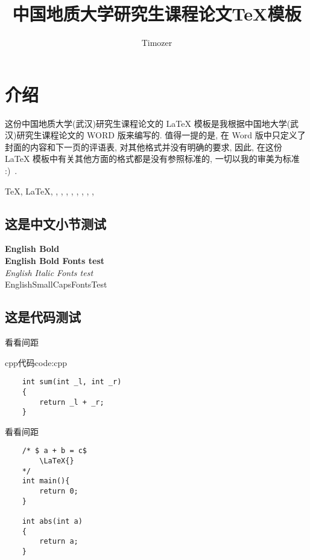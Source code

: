 \documentclass{cugrep}
\title{中国地质大学研究生课程论文\TeX{}模板}
\author{Timozer}
\begin{document}
\maketitle

\frontmatter
{}
\makeabstract 

\tableofcontents
\clearpage

\mainmatter
\chapter{介绍}
这份中国地质大学(武汉)研究生课程论文的 \LaTeX{} 模板是我根据中国地大学(武汉)研究生课程论文的 {\sc WORD} 版来编写的. 
值得一提的是, 在 {\sc Word} 版中只定义了封面的内容和下一页的评语表, 对其他格式并没有明确的要求, 因此, 
在这份 \LaTeX{} 模板中有关其他方面的格式都是没有参照标准的, 一切以我的审美为标准 :)~.

\TeX{}, \LaTeX{}, \LaTeXe{}, \XeTeX{}, \XeLaTeX{}, \LuaTeX{}, \LuaLaTeX{}, \MF{}, \MP{}, \BIBTEX, \AMSTEX
\section{这是中文小节测试}
{
\noindent
{\textbf{English Bold}}\\
{\bf English Bold Fonts test} \\
{\textit{English Italic Fonts test}}\\
{\sc EnglishSmallCapsFontsTest}}
\section{这是代码测试}

看看间距

\begin{tcodeenv}{cpp代码}{code:cpp}
    \begin{verbatim}
    int sum(int _l, int _r)
    {
        return _l + _r;
    }
    \end{verbatim}
\end{tcodeenv}

看看间距
\begin{verbatim}
    /* $ a + b = c$ 
        \LaTeX{}
    */
    int main(){
        return 0;
    }

    int abs(int a)
    {
        return a;
    }
\end{verbatim}
\end{document}
